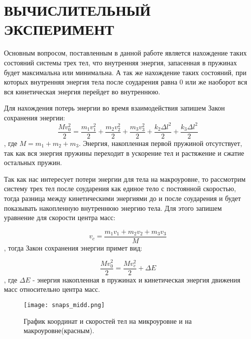 
\chapter{ВЫЧИСЛИТЕЛЬНЫЙ ЭКСПЕРИМЕНТ}

Основным вопросом, поставленным в данной работе является нахождение таких состояний системы трех тел, что внутренняя энергия, запасенная в пружинах будет максимальна или минимальна. А так же нахождение таких состояний, при которых внутренняя энергия тела после соударения равна 0 или же наоборот вся вся кинетическая энергия перейдет во внутреннюю.

Для нахождения потерь энергии во время взаимодействия запишем Закон сохранения энергии:
\begin{equation}\label{eq:energy}
    \frac{M v_0^2}{2} = \frac{m_1 v_1^2}{2} + \frac{m_2 v_2^2}{2} + \frac{m_3 v_3^2}{2} + \frac{k_2 \Delta l^2}{2} + \frac{k_3 \Delta l^2}{2}
\end{equation}, где $M = m_1 + m_2 + m_3$. Энергия, накопленная первой пружиной отсутствует, так как вся энергия пружины переходит в ускорение тел и растяжение и сжатие остальных пружин.

Так как нас интересует потери энергии для тела на макроуровне, то рассмотрим систему трех тел после соударения как единое тело с постоянной скоростью, тогда разница между кинетическими энергиями до и после соударения и будет показывать накопленную внутреннюю энергию тела. Для этого запишем уравнение для скорости центра масс:

\begin{equation}
    v_c = \frac{m_1 v_1 + m_2 v_2 + m_3 v_3}{M}
\end{equation}
, тогда Закон сохранения энергии примет вид:

\begin{equation}
    \frac{M v_0^2}{2} = \frac{M v_c^2}{2} + \Delta E
\end{equation}
, где $\Delta E$ - энергия накопленная в пружинах и кинетическая энергия движения масс относительно центра масс.


\begin{figure}[b!]
    \centering
    \texttt{[image: snaps\_midd.png]}
    \caption{График координат и скоростей тел на микроуровне и на макроуровне(красным).}
    \label{fig:snapmidd}
\end{figure}

